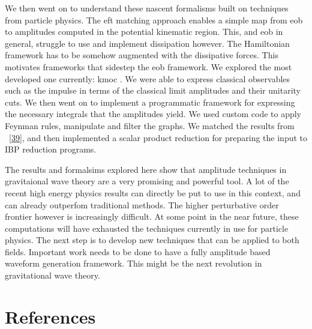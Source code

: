 \documentclass[
  10pt,
  a4paper,
  DIV=11,
  numbers=noendperiod,
  twoside]{scrreprt}
\DeclareRobustCommand{\[}{\begin{equation}}
\DeclareRobustCommand{\]}{\end{equation}}
\begin{document}
We then went on to understand these nascent formalisms built on
techniques from particle physics. The \gls{eft} matching approach
enables a simple map from \gls{eob} to amplitudes computed in the
potential kinematic region. This, and \gls{eob} in general, struggle to
use and implement dissipation however. The Hamiltonian framework has to
be somehow augmented with the dissipative forces. This motivates
frameworks that sidestep the \gls{eob} framework. We explored the most
developed one currently: \gls{kmoc} . We were able to express classical
observables such as the impulse in terms of the classical limit
amplitudes and their unitarity cuts. We then went on to implement a
programmatic framework for expressing the necessary integrals that the
amplitudes yield. We used custom code to apply Feynman rules, manipulate
and filter the graphs. We matched the results from
~{[}\protect\hyperlink{ref-Kosower:2018adc}{39}{]}, and then implemented
a scalar product reduction for preparing the input to IBP reduction
programs.

The results and formalsims explored here show that amplitude techniques
in gravitaional wave theory are a very promising and powerful tool. A
lot of the recent high energy physics results can directly be put to use
in this context, and can already outperfom traditional methods. The
higher perturbative order frontier however is increasingly difficult. At
some point in the near future, these computations will have exhausted
the techniques currently in use for particle physics. The next step is
to develop new techniques that can be applied to both fields. Important
work needs to be done to have a fully amplitude based waveform
generation framework. This might be the next revolution in gravitational
wave theory.


\hypertarget{references}{%
\chapter*{References}\label{references}}

\end{document}
